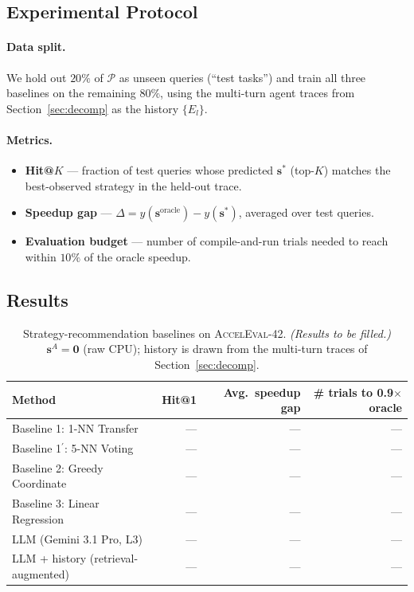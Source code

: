 \documentclass{article}
\begin{document}
\subsection{Experimental Protocol}

\paragraph{Data split.} We hold out $20\%$ of $\mathcal{P}$ as
unseen queries (``test tasks'') and train all three baselines on the
remaining $80\%$, using the multi-turn agent traces from
Section~\ref{sec:decomp} as the history $\{E_l\}$.

\paragraph{Metrics.}
\begin{itemize}
  \item \textbf{Hit@$K$} --- fraction of test queries whose predicted
  $\mathbf{s}^*$ (top-$K$) matches the best-observed strategy in the
  held-out trace.
  \item \textbf{Speedup gap} --- $\Delta = y(\mathbf{s}^{\mathrm{oracle}})
  - y(\mathbf{s}^*)$, averaged over test queries.
  \item \textbf{Evaluation budget} --- number of compile-and-run trials
  needed to reach within $10\%$ of the oracle speedup.
\end{itemize}

\subsection{Results}
\label{sec:strategy-results}

\begin{table}[ht]
\centering
\small
\caption{Strategy-recommendation baselines on \textsc{AccelEval}-42.
\emph{(Results to be filled.)} $\mathbf{s}^A = \mathbf{0}$ (raw CPU);
history is drawn from the multi-turn traces of
Section~\ref{sec:decomp}.}
\label{tab:strategy}
\begin{tabular}{@{}lrrr@{}}
\toprule
\textbf{Method} & \textbf{Hit@1} & \textbf{Avg.\ speedup gap} & \textbf{\# trials to 0.9$\times$oracle} \\
\midrule
Baseline 1: 1-NN Transfer       & --- & --- & --- \\
Baseline 1$^\prime$: 5-NN Voting & --- & --- & --- \\
Baseline 2: Greedy Coordinate    & --- & --- & --- \\
Baseline 3: Linear Regression    & --- & --- & --- \\
\midrule
LLM (Gemini 3.1 Pro, L3)          & --- & --- & --- \\
LLM + history (retrieval-augmented) & --- & --- & --- \\
\bottomrule
\end{tabular}
\end{table}
\end{document}
